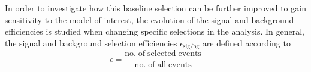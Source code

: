 In order to investigate how this baseline selection can be further improved to gain sensitivity to the model of interest, the evolution of the signal and background efficiencies is studied when changing specific selections in the analysis. In general, the signal and background selection efficiencies $\epsilon_\mathrm{sig/bg}$ are defined according to
\begin{equation}
\epsilon = \frac{\mathrm{no. \; of \; selected \; events}}{\mathrm{no. \; of \; all \; events}}
\end{equation} 
\begin{figure}[!t]
  \centering
{}
\end{figure}
